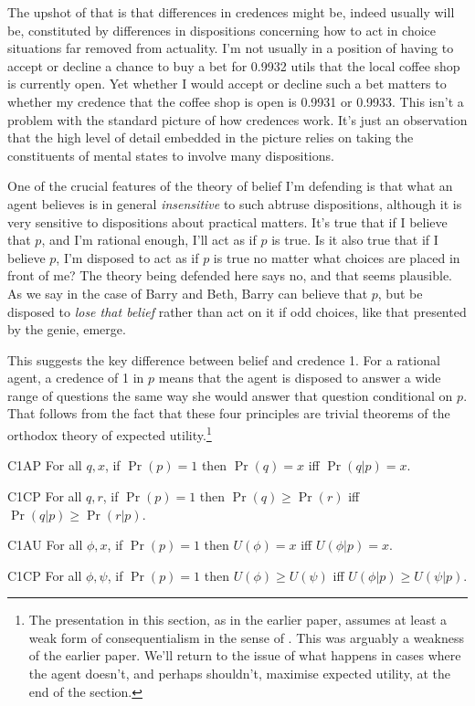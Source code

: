 \documentclass[11pt,oneside]{book}
\begin{document}
The upshot of that is that differences in credences might be, indeed usually will be, constituted by differences in dispositions concerning how to act in choice situations far removed from actuality. I'm not usually in a position of having to accept or decline a chance to buy a bet for 0.9932 utils that the local coffee shop is currently open. Yet whether I would accept or decline such a bet matters to whether my credence that the coffee shop is open is 0.9931 or 0.9933. This isn't a problem with the standard picture of how credences work. It's just an observation that the high level of detail embedded in the picture relies on taking the constituents of mental states to involve many dispositions.

One of the crucial features of the theory of belief I'm defending is that what an agent believes is in general \textit{insensitive} to such abtruse dispositions, although it is very sensitive to dispositions about practical matters. It's true that if I believe that $p$, and I'm rational enough, I'll act as if $p$ is true. Is it also true that if I believe $p$, I'm disposed to act as if $p$ is true no matter what choices are placed in front of me? The theory being defended here says no, and that seems plausible. As we say in the case of Barry and Beth, Barry can believe that $p$, but be disposed to \textit{lose that belief} rather than act on it if odd choices, like that presented by the genie, emerge.

This suggests the key difference between belief and credence 1. For a rational agent, a credence of 1 in $p$ means that the agent is disposed to answer a wide range of questions the same way she would answer that question conditional on $p$. That follows from the fact that these four principles are trivial theorems of the orthodox theory of expected utility.\footnote{The presentation in this section, as in the earlier paper, assumes at least a weak form of consequentialism in the sense of \cite{Hammond1988}. This was arguably a weakness of the earlier paper. We'll return to the issue of what happens in cases where the agent doesn't, and perhaps shouldn't, maximise expected utility, at the end of the section.} 

\begin{description*}
\item[C1AP] For all $q, x$, if $\Pr(p) = 1$ then $\Pr(q) = x$ iff $\Pr(q | p) = x$.
\item[C1CP] For all $q, r$, if $\Pr(p) = 1$ then $\Pr(q) \geq \Pr(r)$ iff $\Pr(q | p) \geq \Pr(r | p)$.
\item[C1AU] For all $\phi, x$, if $\Pr(p) = 1$ then $U(\phi) = x$ iff $U(\phi | p) = x$.
\item[C1CP] For all $\phi, \psi$, if $\Pr(p) = 1$ then $U(\phi) \geq U(\psi)$ iff $U(\phi | p) \geq U(\psi | p)$.
\end{description*}
\end{document}
